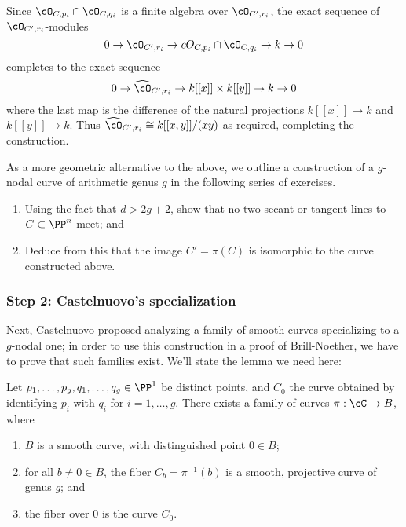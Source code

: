 Since $\cO_{C,p_i}\cap \cO_{C,q_i}$ is a finite algebra over $\cO_{C', r_i}$,
the exact sequence of $\cO_{C', r_i}$-modules
$$
0\to \cO_{C', r_i} \to cO_{C,p_i}\cap \cO_{C,q_i} \to k \to 0
$$
completes to the exact sequence
$$
0\to \widehat\cO_{C', r_i} \to k[[x]]\times k[[y]] \to k \to 0
$$
where the last map is the difference of the natural projections
$k[[x]] \to k$ and $k[[y]] \to k$. Thus
$\widehat\cO_{C', r_i} \cong k[[x,y]]/(xy)$ as required, completing the construction.

As a more geometric alternative to the above, we outline a construction of a $g$-nodal curve of arithmetic genus $g$ in the following series of exercises. 

\begin{exercise}
\begin{enumerate}
\item Using the fact that $d > 2g+2$, show that no two secant or tangent lines to $C \subset \PP^n$ meet; and
\item Deduce from this that the image $C' = \pi(C)$ is isomorphic to the curve constructed above.
\end{enumerate}
\end{exercise}

\subsubsection{Step 2: Castelnuovo's specialization}

Next, Castelnuovo proposed analyzing a family of smooth curves specializing to a $g$-nodal one; in order to use this construction in a proof of Brill-Noether, we have to prove that such families exist. We'll state the lemma we need here:

\begin{lemma}\label{specialization to nodal curve}
Let $p_1,\dots,p_g, q_1,\dots, q_g \in \PP^1$ be distinct points, and $C_0$ the curve obtained by identifying $p_i$ with $q_i$ for $i = 1,\dots,g$. There exists a family of curves $\pi : \cC \to B$, where
\begin{enumerate}
\item $B$ is a smooth curve, with distinguished point $0 \in B$;
\item for all $b \neq 0 \in B$, the fiber $C_b = \pi^{-1}(b)$ is a smooth, projective curve of genus $g$;  and
\item the fiber over $0$ is the curve $C_0$.
\end{enumerate}
\end{lemma}

